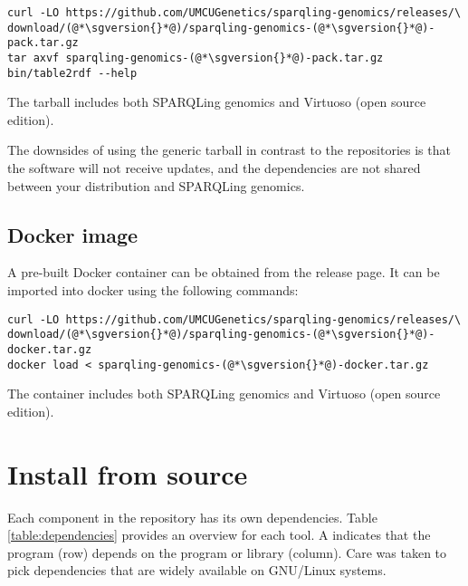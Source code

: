 \begin{lstlisting}
curl -LO https://github.com/UMCUGenetics/sparqling-genomics/releases/\
download/(@*\sgversion{}*@)/sparqling-genomics-(@*\sgversion{}*@)-pack.tar.gz
tar axvf sparqling-genomics-(@*\sgversion{}*@)-pack.tar.gz
bin/table2rdf --help
\end{lstlisting}

  The tarball includes both SPARQLing genomics and Virtuoso (open source
  edition).

  The downsides of using the generic tarball in contrast to the repositories is
  that the software will not receive updates, and the dependencies are not
  shared between your distribution and SPARQLing genomics.

\subsection{Docker image}

  A pre-built Docker container can be obtained from the release page.  It
  can be imported into docker using the following commands:

\begin{lstlisting}
curl -LO https://github.com/UMCUGenetics/sparqling-genomics/releases/\
download/(@*\sgversion{}*@)/sparqling-genomics-(@*\sgversion{}*@)-docker.tar.gz
docker load < sparqling-genomics-(@*\sgversion{}*@)-docker.tar.gz
\end{lstlisting}

  The container includes both SPARQLing genomics and Virtuoso (open source
  edition).

\pagebreak{}
\section{Install from source}
\label{sec:source-installation}

  Each component in the repository has its own dependencies.  Table
  \ref{table:dependencies} provides an overview for each tool.  A \B{}
  indicates that the program (row) depends on the program or library (column).
  Care was taken to pick dependencies that are widely available on GNU/Linux
  systems.

